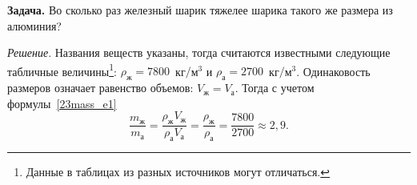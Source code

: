 \documentclass[main.tex]{subfiles}
\begin{document}
\medskip

\noindent\textbf{Задача.} Во сколько раз железный шарик тяжелее шарика такого же размера из алюминия?

\smallskip

\noindent\emph{Решение}. Названия веществ указаны, тогда считаются известными следующие табличные величины\footnote{Данные в таблицах из разных источников могут отличаться.}: $\rho_\text{ж}=7800$~кг$/$м$^3$ и $\rho_\text{а}=2700$~кг$/$м$^3$. Одинаковость размеров означает равенство объемов: $V_\text{ж}=V_\text{а}$. Тогда с учетом формулы~\eqref{23mass_e1}
\[
\dfrac{m_\text{ж}}{m_\text{а}}=\dfrac{\rho_\text{ж}V_\text{ж}}{\rho_\text{а}V_\text{а}}=\dfrac{\rho_\text{ж}}{\rho_\text{а}}=\dfrac{7800}{2700}\approx 2{,}9.
\]








 
\end{document}
